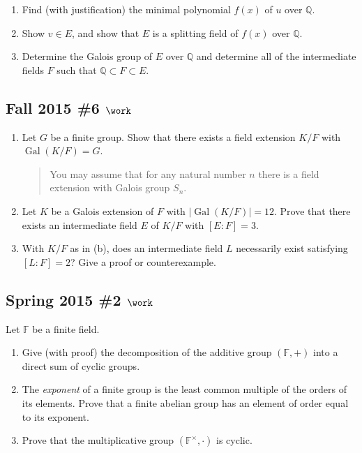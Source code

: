 \begin{enumerate}
\def\labelenumi{\alph{enumi}.}
\item
  Find (with justification) the minimal polynomial \(f(x)\) of \(u\)
  over \({\mathbb{Q}}\).
\item
  Show \(v\in E\), and show that \(E\) is a splitting field of \(f(x)\)
  over \({\mathbb{Q}}\).
\item
  Determine the Galois group of \(E\) over \({\mathbb{Q}}\) and
  determine all of the intermediate fields \(F\) such that
  \({\mathbb{Q}}\subset F \subset E\).
\end{enumerate}

\hypertarget{fall-2015-6-work}{%
\subsection{\texorpdfstring{Fall 2015 \#6
\(\work\)}{Fall 2015 \#6 \textbackslash work}}\label{fall-2015-6-work}}

\begin{enumerate}
\def\labelenumi{\alph{enumi}.}
\item
  Let \(G\) be a finite group. Show that there exists a field extension
  \(K/F\) with \(\operatorname{Gal}(K/F) = G\).

  \begin{quote}
  You may assume that for any natural number \(n\) there is a field
  extension with Galois group \(S_n\).
  \end{quote}
\item
  Let \(K\) be a Galois extension of \(F\) with
  \({\left\lvert {\operatorname{Gal}(K/F)} \right\rvert} = 12\). Prove
  that there exists an intermediate field \(E\) of \(K/F\) with
  \([E: F] = 3\).
\item
  With \(K/F\) as in (b), does an intermediate field \(L\) necessarily
  exist satisfying \([L: F] = 2\)? Give a proof or counterexample.
\end{enumerate}

\hypertarget{spring-2015-2-work}{%
\subsection{\texorpdfstring{Spring 2015 \#2
\(\work\)}{Spring 2015 \#2 \textbackslash work}}\label{spring-2015-2-work}}

Let \({\mathbb{F}}\) be a finite field.

\begin{enumerate}
\def\labelenumi{\alph{enumi}.}
\item
  Give (with proof) the decomposition of the additive group
  \(({\mathbb{F}}, +)\) into a direct sum of cyclic groups.
\item
  The \emph{exponent} of a finite group is the least common multiple of
  the orders of its elements. Prove that a finite abelian group has an
  element of order equal to its exponent.
\item
  Prove that the multiplicative group \(({\mathbb{F}}^{\times}, \cdot)\)
  is cyclic.
\end{enumerate}

